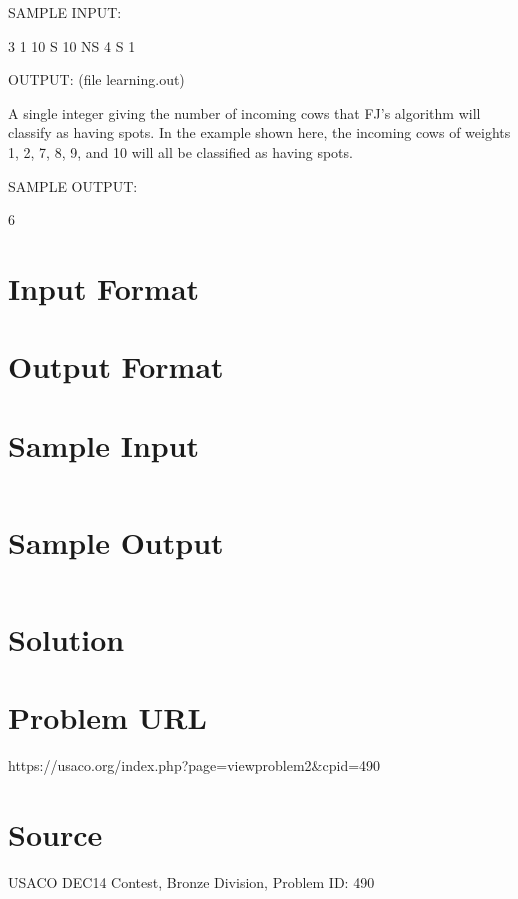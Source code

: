 \documentclass[12pt]{article}
\begin{document}
SAMPLE INPUT:

3 1 10
S 10
NS 4
S 1

OUTPUT: (file learning.out)

A single integer giving the number of incoming cows that FJ's
algorithm will classify as having spots.  In the example shown
here, the incoming cows of weights 1, 2, 7, 8, 9, and 10 
will all be classified as having spots.

SAMPLE OUTPUT:

6



\section*{Input Format}


\section*{Output Format}


\section*{Sample Input}
\begin{verbatim}

\end{verbatim}

\section*{Sample Output}
\begin{verbatim}

\end{verbatim}

\section*{Solution}


\section*{Problem URL}
https://usaco.org/index.php?page=viewproblem2&cpid=490

\section*{Source}
USACO DEC14 Contest, Bronze Division, Problem ID: 490
\end{document}
